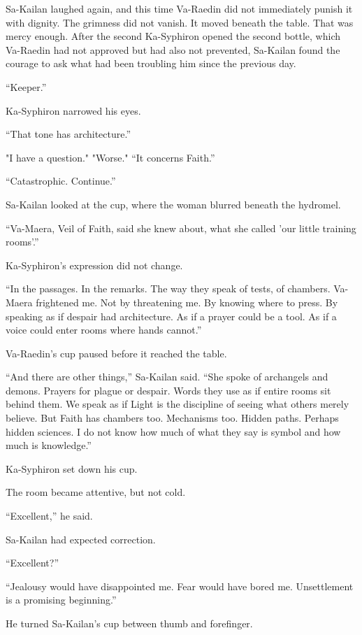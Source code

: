 Sa-Kailan laughed again, and this time Va-Raedin did not immediately punish it with dignity.
The grimness did not vanish.
It moved beneath the table.
That was mercy enough.
After the second Ka-Syphiron opened the second bottle, which Va-Raedin had not approved but had also not prevented, Sa-Kailan found the courage to ask what had been troubling him since the previous day.\par
“Keeper.”\par
Ka-Syphiron narrowed his eyes.\par
“That tone has architecture.”\par
"I have a question."
"Worse."
“It concerns Faith.”\par
“Catastrophic. Continue.”\par
Sa-Kailan looked at the cup, where the woman blurred beneath the hydromel.\par
“Va-Maera, Veil of Faith, said she knew about, what she called 'our little training rooms'.”\par
Ka-Syphiron’s expression did not change.\par
“In the passages. In the remarks. The way they speak of tests, of chambers. Va-Maera frightened me. Not by threatening me. 
By knowing where to press. By speaking as if despair had architecture. As if a prayer could be a tool. As if a voice could enter rooms where hands cannot.”\par
Va-Raedin’s cup paused before it reached the table.\par
“And there are other things,” Sa-Kailan said. “She spoke of archangels and demons. Prayers for plague or despair. 
Words they use as if entire rooms sit behind them. We speak as if Light is the discipline of seeing what others merely believe. 
But Faith has chambers too. Mechanisms too. Hidden paths. Perhaps hidden sciences. 
I do not know how much of what they say is symbol and how much is knowledge.”\par
Ka-Syphiron set down his cup.\par
The room became attentive, but not cold.\par
“Excellent,” he said.\par
Sa-Kailan had expected correction.\par
“Excellent?”\par
“Jealousy would have disappointed me. Fear would have bored me. Unsettlement is a promising beginning.”\par
He turned Sa-Kailan’s cup between thumb and forefinger.\par
